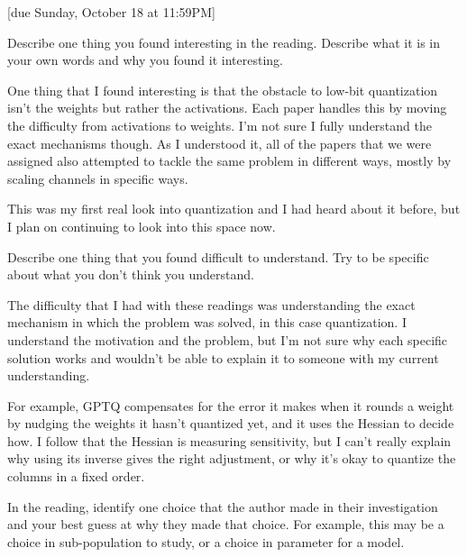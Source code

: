 \documentclass{article}
\begin{document}
[due Sunday, October 18 at 11:59PM]

\begin{probset}
\begin{prob}
    Describe one thing you found interesting in the reading. Describe what it is in your own words and why you found it interesting.

    \begin{soln}
        One thing that I found interesting is that the obstacle to low-bit quantization isn't the weights but rather the activations. Each paper handles this by moving the difficulty from activations to weights. I'm not sure I fully understand the exact mechanisms though. As I understood it, all of the papers that we were assigned also attempted to tackle the same problem in different ways, mostly by scaling channels in specific ways.

        This was my first real look into quantization and I had heard about it before, but I plan on continuing to look into this space now.
    \end{soln}
\end{prob}

\begin{prob}
    Describe one thing that you found difficult to understand. Try to be specific about what you don't think you understand.

    \begin{soln}
        The difficulty that I had with these readings was understanding the exact mechanism in which the problem was solved, in this case quantization. I understand the motivation and the problem, but I'm not sure why each specific solution works and wouldn't be able to explain it to someone with my current understanding. 
        
        For example, GPTQ compensates for the error it makes when it rounds a weight by nudging the weights it hasn't quantized yet, and it uses the Hessian to decide how. I follow that the Hessian is measuring sensitivity, but I can't really explain why using its inverse gives the right adjustment, or why it's okay to quantize the columns in a fixed order.
    \end{soln}
\end{prob}

\begin{prob}
    In the reading, identify one choice that the author made in their investigation and your best guess at why they made that choice. For example, this may be a choice in sub-population to study, or a choice in parameter for a model.


\end{prob}
\end{probset}
\end{document}
